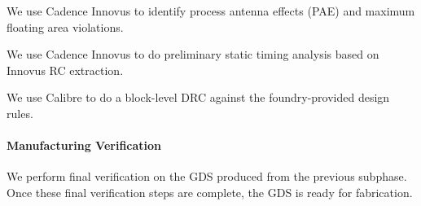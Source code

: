 \begin{cbxlist}{1.5em}{0em}{0.5em}
  \item {} We use Cadence Innovus to identify process
     antenna effects (PAE) and maximum floating area violations.

  \item {} We use Cadence Innovus to do preliminary
     static timing analysis based on Innovus RC extraction.

  \item {} We use Calibre to do a
     block-level DRC against the foundry-provided design rules.

\end{cbxlist}

\smallskip
\paragraph{Manufacturing Verification}
We perform final verification on the GDS produced from the previous
subphase. Once these final verification steps are complete, the GDS is
ready for fabrication.

